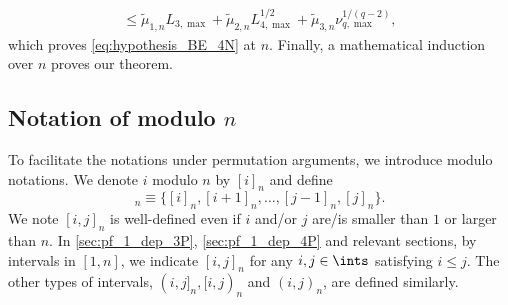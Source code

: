 \documentclass[aos]{imsart}
\begin{document}
\begin{appendix}
\begin{equation*}
\begin{aligned}
    \leq \tilde\mu_{1,n} {L}_{3,\max}
    + \tilde\mu_{2,n} {L}_{4,\max}^{1/2}
    + \tilde\mu_{3,n} \nu_{q,\max}^{1/(q-2)},
\end{aligned}
\end{equation*}
which proves \eqref{eq:hypothesis_BE_4N} at $n$.
Finally, a mathematical induction over $n$ proves our theorem.




\subsection{Notation of modulo \texorpdfstring{$n$}{n}} \label{sec:Z_n}

To facilitate the notations under permutation arguments, we introduce modulo notations.
We denote $i$ modulo $n$ by $[i]_n$ and
%
define
\begin{equation*}
    [i,j]_n \equiv \{[i]_n, [i+1]_n, \dots, [j-1]_n, [j]_n\}.
\end{equation*}
We note $[i,j]_n$ is well-defined even if $i$ and/or $j$ are/is smaller than $1$ or larger than $n$. In \cref{sec:pf_1_dep_3P}, \cref{sec:pf_1_dep_4P} and relevant sections, by intervals in $[1,n]$, we indicate $[i,j]_n$ for any $i,j \in \ints$ satisfying $i \leq j$.
The other types of intervals, $(i,j]_n, [i,j)_n$ and $(i,j)_n$, are defined similarly.


\end{appendix}
\end{document}
